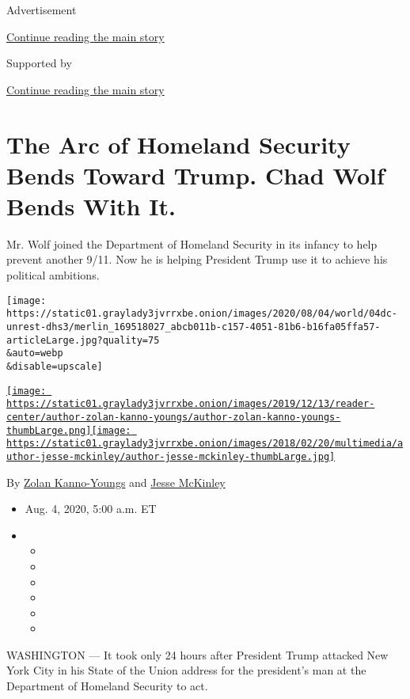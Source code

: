 Advertisement

\protect\hyperlink{after-top}{Continue reading the main story}

Supported by

\protect\hyperlink{after-sponsor}{Continue reading the main story}

\hypertarget{the-arc-of-homeland-security-bends-toward-trump-chad-wolf-bends-with-it}{%
\section{The Arc of Homeland Security Bends Toward Trump. Chad Wolf
Bends With
It.}\label{the-arc-of-homeland-security-bends-toward-trump-chad-wolf-bends-with-it}}

Mr. Wolf joined the Department of Homeland Security in its infancy to
help prevent another 9/11. Now he is helping President Trump use it to
achieve his political ambitions.

\texttt{[image: https://static01.graylady3jvrrxbe.onion/images/2020/08/04/world/04dc-unrest-dhs3/merlin\_169518027\_abcb011b-c157-4051-81b6-b16fa05ffa57-articleLarge.jpg?quality=75\\\&auto=webp\\\&disable=upscale]}

\href{https://www.nytimes3xbfgragh.onion/by/zolan-kanno-youngs}{\texttt{[image: https://static01.graylady3jvrrxbe.onion/images/2019/12/13/reader-center/author-zolan-kanno-youngs/author-zolan-kanno-youngs-thumbLarge.png]}}\href{https://www.nytimes3xbfgragh.onion/by/jesse-mckinley}{\texttt{[image: https://static01.graylady3jvrrxbe.onion/images/2018/02/20/multimedia/author-jesse-mckinley/author-jesse-mckinley-thumbLarge.jpg]}}

By \href{https://www.nytimes3xbfgragh.onion/by/zolan-kanno-youngs}{Zolan
Kanno-Youngs} and
\href{https://www.nytimes3xbfgragh.onion/by/jesse-mckinley}{Jesse
McKinley}

\begin{itemize}
\item
  Aug. 4, 2020, 5:00 a.m. ET
\item
  \begin{itemize}
  \item
  \item
  \item
  \item
  \item
  \item
  \end{itemize}
\end{itemize}

WASHINGTON --- It took only 24 hours after President Trump attacked New
York City in his State of the Union address for the president's man at
the Department of Homeland Security to act.

